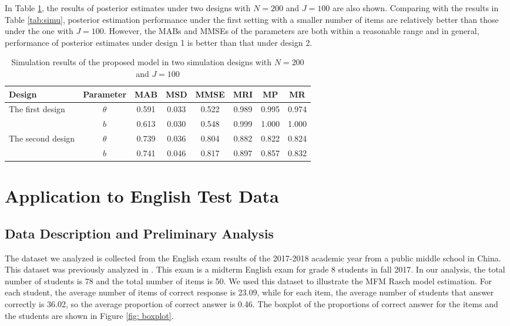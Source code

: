 \documentclass[12pt]{article}
\begin{document}
In Table \ref{tab:simu2}, the results of posterior estimates under two designs with $N=200$ and $J=100$ are also shown. Comparing with the results in Table \ref{tab:simu}, posterior estimation performance under the first setting with a smaller number of items are relatively better than those under the one with $J=100$.  However, the MABs and MMSEs of the parameters are both within a reasonable range and in general, performance of posterior estimates under design 1 is better than that under design 2. 

\begin{table}[h!]
	\centering
	\caption{Simulation results of the proposed model in two simulation designs with $N=200$ and $J=100$}\label{tab:simu2}
	\begin{tabular}{lccccccc}
		\toprule
		Design & Parameter& MAB & MSD &MMSE & MRI & MP & MR\\
		\midrule 
		\multirow{2}{*}{The first design} & $\theta$ & 0.591 & 0.033 & 0.522 & 0.989 & 0.995 & 0.974\\
		& $b$ & 0.613 & 0.030 & 0.548 & 0.999  & 1.000 & 1.000 \\
		\multirow{2}{*}{The second design}  &$\theta$ & 0.739 & 0.036 & 0.804 & 0.882   & 0.822 & 0.824\\
		& $b$ & 0.741 & 0.046 & 0.817 & 0.897 &0.857 & 0.832\\
		\bottomrule
	\end{tabular}
\end{table} 

\section{Application to English Test Data}\label{sec:real_data}
\subsection{Data Description and Preliminary Analysis} 
The dataset we analyzed is collected from the English exam results of the 2017-2018 academic year from a public middle school in China. This dataset was previously analyzed in \citet{liu2019comparison}. This exam is a midterm English exam for grade 8 students in fall 2017. In our analysis, the total number of students is 78 and the total number of items is 50. We used this dataset to illustrate the MFM Rasch model estimation.
For each student, the average number of items of correct response is 23.09, while for each item, the average number of students that answer correctly is 36.02, so the average proportion of correct answer is 0.46. The boxplot of the proportions of correct answer for the items and the students are shown in Figure \ref{fig: boxplot}. 
\end{document}
